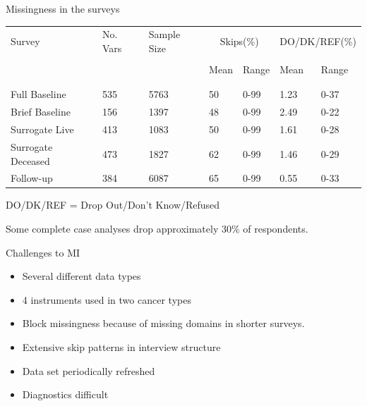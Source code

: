 \documentclass[11pt,handout]{beamer}
\begin{document}
\begin{frame}{Missingness in the surveys}

\begin{center}
\begin{scriptsize}
   \begin{tabular*}{0.85\textwidth}{@{\extracolsep{\fill}} lllllll}
   \hline
   {Survey} & {No. Vars} & {Sample Size} & 
   \multicolumn{2}{c}{{Skips(\%)}} & 
   \multicolumn{2}{c}{{DO/DK/REF(\%)}} \\
   & & & & & & \\
   & & & Mean & Range & Mean & Range \\ 
   & & & & & &  \\ \hline
   & & & & & & \\
   Full Baseline & 535 & 5763 & 50 & 0-99 & 1.23 & 0-37 \\   
   Brief Baseline & 156 & 1397 & 48 & 0-99 & 2.49 & 0-22 \\
   Surrogate Live & 413 & 1083 & 50 & 0-99 & 1.61 & 0-28 \\
   Surrogate Deceased & 473 & 1827 & 62 & 0-99 & 1.46 & 0-29 \\
   Follow-up & 384 & 6087 & 65 & 0-99 & 0.55 & 0-33 \\ 
   \end{tabular*}
\vspace{0.2in}
	
DO/DK/REF = Drop Out/Don't Know/Refused	
\medskip

\end{scriptsize}
\end{center}

Some complete case analyses drop approximately 30\% of respondents.
	
\end{frame}

\begin{frame}{Challenges to MI}

	
\begin{itemize}

  \item Several different data types
  
  \item 4 instruments used in two cancer types
  
  \item Block missingness because of missing domains in shorter surveys.
  
  \item Extensive skip patterns in interview structure
  
  \item Data set periodically refreshed
  
  \item Diagnostics difficult

\end{itemize}
	
\end{frame}
\end{document}
